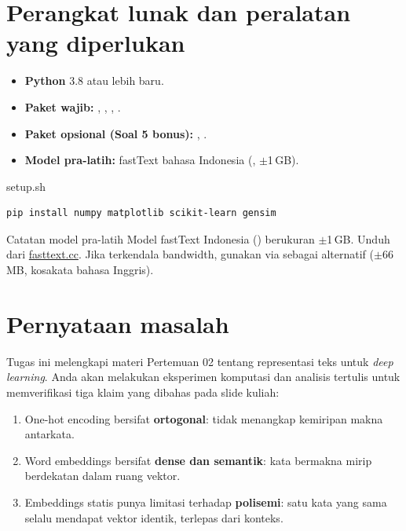 \documentclass[12pt, a4paper]{article}
\begin{document}
\section{Perangkat lunak dan peralatan yang diperlukan}\label{sec:requiredsw}

\begin{itemize}[itemsep=2pt,parsep=0pt,topsep=2pt,partopsep=2pt]
  \item[\color{ctpBlue}\faPython] \textbf{Python} 3.8 atau lebih baru.
  \item[\color{ctpBlue}\faFileCode] \textbf{Paket wajib:} , , , .
  \item[\color{ctpBlue}\faFileCode] \textbf{Paket opsional (Soal 5 bonus):} , .
  \item[\color{ctpBlue}\faDownload] \textbf{Model pra-latih:} fastText bahasa Indonesia (, $\pm$1\,GB).
\end{itemize}

\begin{codewindow}{setup.sh}
\begin{lstlisting}[style=pycode]
pip install numpy matplotlib scikit-learn gensim
\end{lstlisting}
\end{codewindow}

\begin{minipage}{\linewidth}
\begin{bclogo}[couleur=ctpMantle, arrondi=0.1, logo=\bcinfo, ombre=false, couleurBord=ctpSurface, epBord=0.6]{Catatan model pra-latih}
  Model fastText Indonesia () berukuran $\pm$1\,GB. Unduh dari
  \href{https://fasttext.cc/docs/en/crawl-vectors.html}{fasttext.cc}. Jika terkendala
  bandwidth, gunakan  via  sebagai
  alternatif ($\pm$66\,MB, kosakata bahasa Inggris).
\end{bclogo}
\end{minipage}

\section{Pernyataan masalah}\label{sec:intro}

Tugas ini melengkapi materi Pertemuan 02 tentang representasi teks untuk \emph{deep learning}.
Anda akan melakukan eksperimen komputasi dan analisis tertulis untuk memverifikasi tiga klaim yang dibahas pada slide kuliah:
\begin{enumerate}
  \item One-hot encoding bersifat \textbf{ortogonal}: tidak menangkap kemiripan makna antarkata.
  \item Word embeddings bersifat \textbf{dense dan semantik}: kata bermakna mirip berdekatan dalam ruang vektor.
  \item Embeddings statis punya limitasi terhadap \textbf{polisemi}: satu kata yang sama selalu mendapat vektor identik, terlepas dari konteks.
\end{enumerate}
\end{document}
